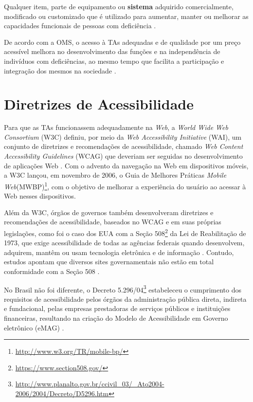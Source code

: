 \begin{citacao}
    Qualquer item, parte de equipamento ou \textbf{sistema} adquirido comercialmente, modificado ou customizado que é utilizado para aumentar, manter ou melhorar as capacidades
    funcionais de pessoas com deficiência \cite{Cook2014}.
\end{citacao}

De acordo com a OMS, o acesso à TAs adequadas e de qualidade por um preço acessível melhora
no desenvolvimento das funções e na independência de indivíduos com deficiências, ao mesmo tempo que facilita
a participação e integração dos mesmos na sociedade \cite{world2019global}.

\section{Diretrizes de Acessibilidade}

Para que as TAs funcionassem adequadamente na \textit{Web}, a \textit{World Wide Web Consortium} (W3C) definiu, por meio da
\emph{Web Accessibility Initiative} (WAI), um conjunto de diretrizes e recomendações de acessibilidade, chamado
\emph{Web Content Accessibility Guidelines} (WCAG) que deveriam ser seguidas no desenvolvimento de aplicações Web
\cite{W3C2019}. Com o advento da navegação na Web em dispositivos móveis, a W3C lançou, em novembro
de 2006, o Guia de Melhores Práticas \emph{Mobile Web}(MWBP)\footnote{\url{http://www.w3.org/TR/mobile-bp/}}, com o objetivo de
melhorar a experiência do usuário ao acessar à Web nesses dispositivos.

Além da W3C, órgãos de governos também desenvolveram diretrizes e recomendações de acessibilidade, baseados no WCAG e
em suas próprias legislações, como foi o caso dos EUA com a Seção 508\footnote{\url{https://www.section508.gov/}}
da Lei de Reabilitação de 1973, que exige acessibilidade de todas as agências federais quando desenvolvem,
adquirem, mantêm ou usam tecnologia eletrônica e de informação \cite{JAEGER2006169}. Contudo, estudos apontam que diversos
sites governamentais não estão em total conformidade com a Seção 508 \cite{KING2016715,YI201575}.

No Brasil não foi diferente, o Decreto 5.296/04\footnote{\url{http://www.planalto.gov.br/ccivil_03/_Ato2004-2006/2004/Decreto/D5296.htm}}
estabeleceu o cumprimento dos requisitos de acessibilidade pelos órgãos da administração pública direta, indireta e fundacional,
pelas empresas prestadoras de serviços públicos e instituições financeiras, resultando na criação do Modelo de Acessibilidade
em Governo eletrônico (eMAG) \cite{EMAG_2007}.

